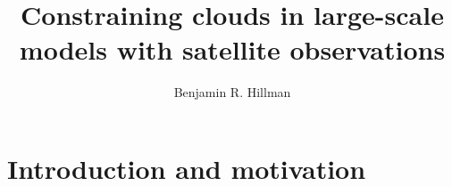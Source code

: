 \documentclass{article}
\author{Benjamin R. Hillman}
\title{Constraining clouds in large-scale models with satellite observations}
\begin{document}
\maketitle
\section{Introduction and motivation}

\end{document}
